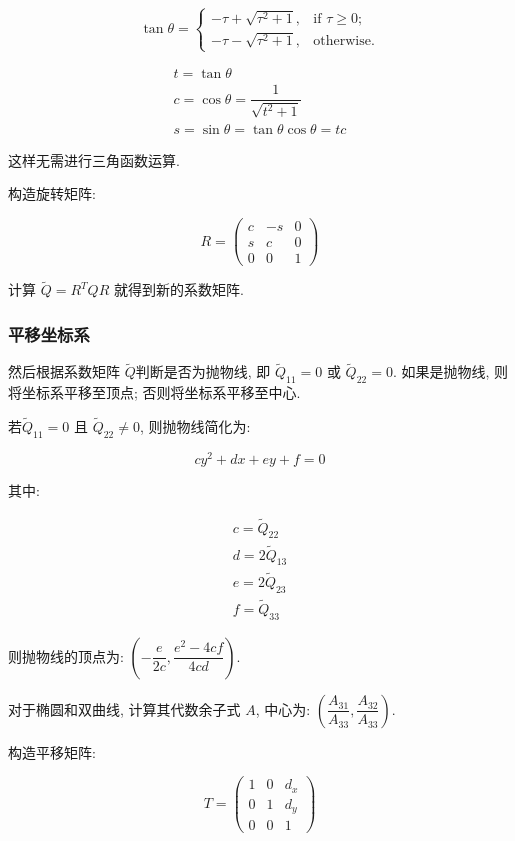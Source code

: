 \[
  \tan\theta = \begin{cases}
    - \tau + \sqrt{\tau^2+1}, & \text{if } \tau \geq 0;\\
    - \tau - \sqrt{\tau^2+1}, & \text{otherwise}.
  \end{cases}
\]

\begin{gather*}
  t = \tan\theta\\
  c = \cos\theta = \dfrac{1}{\sqrt{t^2+1}}\\
  s = \sin\theta = \tan\theta \cos\theta = tc
\end{gather*}

这样无需进行三角函数运算.

构造旋转矩阵:

\[
  R =
  \begin{pmatrix}
    c & -s & 0\\
    s & c & 0\\
    0 & 0 & 1
  \end{pmatrix}
\]

计算 $\tilde{Q}=R^TQR$ 就得到新的系数矩阵.

\subsubsection{平移坐标系}

然后根据系数矩阵 $\tilde{Q}$判断是否为抛物线, 即 $\tilde{Q}_{11} = 0$ 或 $\tilde{Q}_{22} = 0$. 如果是抛物线,
则将坐标系平移至顶点; 否则将坐标系平移至中心.

若$\tilde{Q}_{11} = 0$ 且 $\tilde{Q}_{22} \neq 0$, 则抛物线简化为:

\[
  cy^2+dx+ey+f=0
\] 

其中:

\begin{gather*}
  c = \tilde{Q}_{22}\\
  d = 2\tilde{Q}_{13}\\
  e = 2\tilde{Q}_{23}\\
  f = \tilde{Q}_{33}
\end{gather*}

则抛物线的顶点为: $\left(-\dfrac{e}{2c},\dfrac{e^2-4cf}{4cd}\right)$.

对于椭圆和双曲线, 计算其代数余子式 $A$,
中心为: $\left(\dfrac{A_{31}}{A_{33}},\dfrac{A_{32}}{A_{33}}\right)$.

构造平移矩阵:

\[
  T =
  \begin{pmatrix}
    1 & 0 & d_x\\
    0 & 1 & d_y\\
    0 & 0 & 1
  \end{pmatrix}
\]

